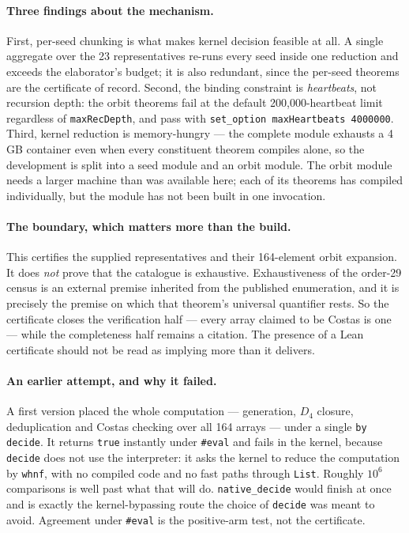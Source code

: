 \documentclass[11pt,a4paper,oneside]{report}
\theoremstyle{definition}
\begin{document}
\paragraph{Three findings about the mechanism.} First, per-seed chunking is what
makes kernel decision feasible at all. A single aggregate over the 23
representatives re-runs every seed inside one reduction and exceeds the
elaborator's budget; it is also redundant, since the per-seed theorems are the
certificate of record. Second, the binding constraint is \emph{heartbeats}, not
recursion depth: the orbit theorems fail at the default 200{,}000-heartbeat limit
regardless of \texttt{maxRecDepth}, and pass with
\texttt{set\_option maxHeartbeats 4000000}. Third, kernel reduction is
memory-hungry --- the complete module exhausts a 4\,GB container even when every
constituent theorem compiles alone, so the development is split into a seed
module and an orbit module. The orbit module needs a larger machine than was
available here; each of its theorems has compiled individually, but the module has not been built in one invocation.

\paragraph{The boundary, which matters more than the build.} This certifies the
supplied representatives and their 164-element orbit expansion. It does
\emph{not} prove that the catalogue is exhaustive. Exhaustiveness of the order-29
census is an external premise inherited from the published enumeration, and it is
precisely the premise on which that theorem's universal quantifier
rests. So the certificate closes the verification half --- every array claimed to
be Costas is one --- while the completeness half remains a citation. The presence of a Lean certificate should not be read as implying more than it delivers.

\paragraph{An earlier attempt, and why it failed.} A first version placed the
whole computation --- generation, $D_4$ closure, deduplication and Costas
checking over all 164 arrays --- under a single \texttt{by decide}. It returns
\texttt{true} instantly under \texttt{\#eval} and fails in the kernel, because
\texttt{decide} does not use the interpreter: it asks the kernel to reduce the
computation by \texttt{whnf}, with no compiled code and no fast paths through
\texttt{List}. Roughly $10^6$ comparisons is well past what that will do.
\texttt{native\_decide} would finish at once and is exactly the kernel-bypassing
route the choice of \texttt{decide} was meant to avoid. Agreement under
\texttt{\#eval} is the positive-arm test, not the certificate.
\end{document}
